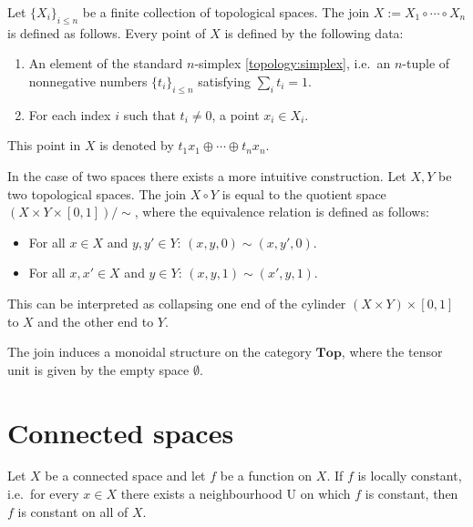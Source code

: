     \begin{construct}[Join]\label{topology:join}
        Let $\{X_i\}_{i\leq n}$ be a finite collection of topological spaces. The join $X:=X_1\circ\cdots\circ X_n$ is defined as follows. Every point of $X$ is defined by the following data:
        \begin{enumerate}
            \item An element of the standard $n$-simplex \ref{topology:simplex}, i.e.~an $n$-tuple of nonnegative numbers $\{t_i\}_{i\leq n}$ satisfying $\sum_it_i=1$.
            \item For each index $i$ such that $t_i\neq 0$, a point $x_i\in X_i$.
        \end{enumerate}
        This point in $X$ is denoted by $t_1x_1\oplus\cdots\oplus t_nx_n$.

        In the case of two spaces there exists a more intuitive construction. Let $X,Y$ be two topological spaces. The join $X\circ Y$ is equal to the quotient space $(X\times Y\times[0,1])/\sim$, where the equivalence relation is defined as follows:
        \begin{itemize}
            \item For all $x\in X$ and $y,y'\in Y$: $(x,y,0)\sim(x,y',0)$.
            \item For all $x,x'\in X$ and $y\in Y$: $(x,y,1)\sim(x',y,1)$.
        \end{itemize}
        This can be interpreted as collapsing one end of the cylinder $(X\times Y)\times[0,1]$ to $X$ and the other end to $Y$.
    \end{construct}
    \begin{property}
        The join induces a monoidal structure on the category $\mathbf{Top}$, where the tensor unit is given by the empty space $\emptyset$.
    \end{property}

\section{Connected spaces}


    \begin{property}
        Let $X$ be a connected space and let $f$ be a function on $X$. If $f$ is locally constant, i.e.~for every $x\in X$ there exists a neighbourhood U on which $f$ is constant, then $f$ is constant on all of $X$.
    \end{property}

